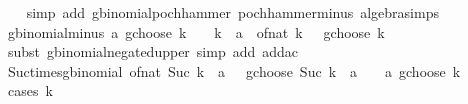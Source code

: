 \begin{isabellebody}
%
\isadelimproof
\ \ %
\endisadelimproof
%
\isatagproof
{}\isamarkupfalse%
\ {\isacharparenleft}{\kern0pt}simp\ add{\isacharcolon}{\kern0pt}\ gbinomial{\isacharunderscore}{\kern0pt}pochhammer\ pochhammer{\isacharunderscore}{\kern0pt}minus\ algebra{\isacharunderscore}{\kern0pt}simps{\isacharparenright}{\kern0pt}%
\endisatagproof
{\isafoldproof}%
%
\isadelimproof
\isanewline
%
\endisadelimproof
\isanewline
{}\isamarkupfalse%
\ gbinomial{\isacharunderscore}{\kern0pt}minus{\isacharcolon}{\kern0pt}\ {\isachardoublequoteopen}{\isacharparenleft}{\kern0pt}{\isacharparenleft}{\kern0pt}{\isacharminus}{\kern0pt}a{\isacharparenright}{\kern0pt}\ gchoose\ k{\isacharparenright}{\kern0pt}\ {\isacharequal}{\kern0pt}\ {\isacharparenleft}{\kern0pt}{\isacharminus}{\kern0pt}{}{\isacharparenright}{\kern0pt}\ {\isacharcircum}{\kern0pt}\ k\ {\isacharasterisk}{\kern0pt}\ {\isacharparenleft}{\kern0pt}{\isacharparenleft}{\kern0pt}a\ {\isacharplus}{\kern0pt}\ of{\isacharunderscore}{\kern0pt}nat\ k\ {\isacharminus}{\kern0pt}\ {}{\isacharparenright}{\kern0pt}\ gchoose\ k{\isacharparenright}{\kern0pt}{\isachardoublequoteclose}\isanewline
%
\isadelimproof
\ \ %
\endisadelimproof
%
\isatagproof
{}\isamarkupfalse%
\ {\isacharparenleft}{\kern0pt}subst\ gbinomial{\isacharunderscore}{\kern0pt}negated{\isacharunderscore}{\kern0pt}upper{\isacharparenright}{\kern0pt}\ {\isacharparenleft}{\kern0pt}simp\ add{\isacharcolon}{\kern0pt}\ add{\isacharunderscore}{\kern0pt}ac{\isacharparenright}{\kern0pt}%
\endisatagproof
{\isafoldproof}%
%
\isadelimproof
\isanewline
%
\endisadelimproof
\isanewline
{}\isamarkupfalse%
\ Suc{\isacharunderscore}{\kern0pt}times{\isacharunderscore}{\kern0pt}gbinomial{\isacharcolon}{\kern0pt}\ {\isachardoublequoteopen}of{\isacharunderscore}{\kern0pt}nat\ {\isacharparenleft}{\kern0pt}Suc\ k{\isacharparenright}{\kern0pt}\ {\isacharasterisk}{\kern0pt}\ {\isacharparenleft}{\kern0pt}{\isacharparenleft}{\kern0pt}a\ {\isacharplus}{\kern0pt}\ {}{\isacharparenright}{\kern0pt}\ gchoose\ {\isacharparenleft}{\kern0pt}Suc\ k{\isacharparenright}{\kern0pt}{\isacharparenright}{\kern0pt}\ {\isacharequal}{\kern0pt}\ {\isacharparenleft}{\kern0pt}a\ {\isacharplus}{\kern0pt}\ {}{\isacharparenright}{\kern0pt}\ {\isacharasterisk}{\kern0pt}\ {\isacharparenleft}{\kern0pt}a\ gchoose\ k{\isacharparenright}{\kern0pt}{\isachardoublequoteclose}\isanewline
%
\isadelimproof
%
\endisadelimproof
%
\isatagproof
{}\isamarkupfalse%
\ {\isacharparenleft}{\kern0pt}cases\ k{\isacharparenright}{\kern0pt}\isanewline

\end{isabellebody}
